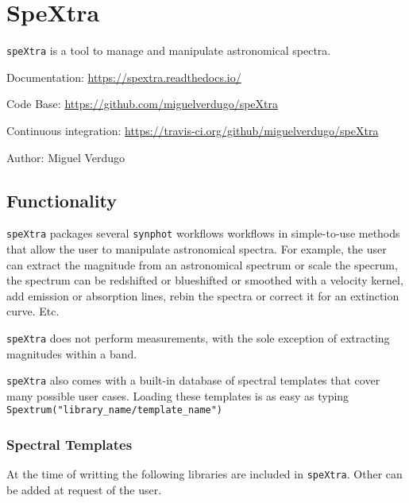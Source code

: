 

\section{SpeXtra%
  \label{spextra}%
}

\texttt{speXtra} is a tool to manage and manipulate astronomical spectra. 

Documentation: \url{https://spextra.readthedocs.io/}

Code Base: \url{https://github.com/miguelverdugo/speXtra}

Continuous integration: \url{https://travis-ci.org/github/miguelverdugo/speXtra}

Author: Miguel Verdugo


\subsection{Functionality%
  \label{functionality}%
}

\texttt{speXtra} packages several \texttt{synphot} workflows
workflows in simple-to-use methods that allow the user 
to manipulate astronomical spectra. For example, the user
can extract the magnitude from an astronomical spectrum or 
scale the specrum, the spectrum can be redshifted or 
blueshifted or smoothed with a velocity kernel, add emission or
absorption lines, rebin the spectra or correct it for an
extinction curve. Etc.

\texttt{speXtra} does not perform measurements, with the sole 
exception of extracting magnitudes within a band. 

\texttt{speXtra} also comes with a built-in database of spectral templates 
that cover many possible user cases. Loading these templates is as
easy as typing \texttt{Spextrum("library_name/template_name")}
 

\subsubsection{Spectral Templates}

At the time of writting the following libraries are included in \texttt{speXtra}. Other can be added 
at request of the user. 

